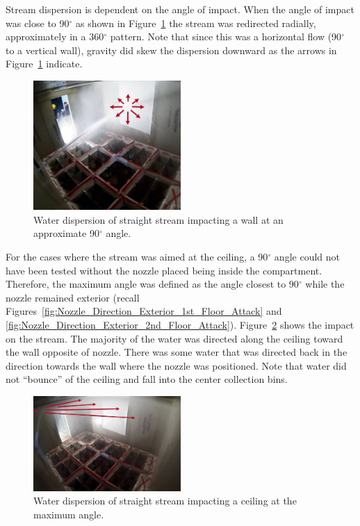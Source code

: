 \documentclass[12pt,oneside]{book}
\begin{document}
Stream dispersion is dependent on the angle of impact. When the angle of impact was close to 90$^{\circ}$ as shown in Figure~\ref{fig:90DegreeImpact} the stream was redirected radially, approximately in a 360$^{\circ}$ pattern. Note that since this was a horizontal flow (90$^{\circ}$ to a vertical wall), gravity did skew the dispersion downward as the arrows in Figure~\ref{fig:90DegreeImpact} indicate.  

\begin{figure}[!ht]
\centering
\includegraphics[width=0.5\textwidth]{Figures/Water_Distribution/Nozzle_Directions/Exterior_AtWall_SB_Arrows}
\caption[Water Dispersion Straight Stream 90$^{\circ}$ Impact Angle]{Water dispersion of straight stream impacting a wall at an approximate 90$^{\circ}$ angle.}
\label{fig:90DegreeImpact}
\end{figure}

For the cases where the stream was aimed at the ceiling, a 90$^{\circ}$ angle could not have been tested without the nozzle placed being inside the compartment. Therefore, the maximum angle was defined as the angle closest to 90$^{\circ}$ while the nozzle remained exterior (recall Figures~\ref{fig:Nozzle_Direction_Exterior_1st_Floor_Attack} and \ref{fig:Nozzle_Direction_Exterior_2nd_Floor_Attack}). Figure~\ref{fig:MaxAngleCeilingImpact} shows the impact on the stream. The majority of the water was directed along the ceiling toward the wall opposite of nozzle. There was some water that was directed back in the direction towards the wall where the nozzle was positioned. Note that water did not ``bounce'' of the ceiling and fall into the center collection bins.

\begin{figure}[!ht]
\centering
\includegraphics[width=0.5\textwidth]{Figures/Water_Distribution/Nozzle_Directions/Exterior_MaxAngleCeiling_SS_Arrows} 
\caption[Water Dispersion Straight Stream Max Angle Ceiling]{Water dispersion of straight stream impacting a ceiling at the maximum angle.}
\label{fig:MaxAngleCeilingImpact}
\end{figure}
\end{document}
